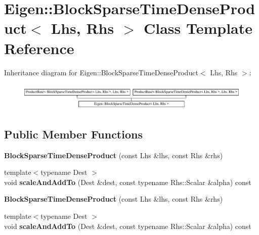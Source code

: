 \hypertarget{class_eigen_1_1_block_sparse_time_dense_product}{}\section{Eigen\+:\+:Block\+Sparse\+Time\+Dense\+Product$<$ Lhs, Rhs $>$ Class Template Reference}
\label{class_eigen_1_1_block_sparse_time_dense_product}
Inheritance diagram for Eigen\+:\+:Block\+Sparse\+Time\+Dense\+Product$<$ Lhs, Rhs $>$\+:\begin{figure}[H]
\begin{center}
\leavevmode
\includegraphics[height=1.314554cm]{class_eigen_1_1_block_sparse_time_dense_product}
\end{center}
\end{figure}
\subsection*{Public Member Functions}
\begin{DoxyCompactItemize}
\item 
\mbox{\label{class_eigen_1_1_block_sparse_time_dense_product_a0965e817adda116fafe1fc4421add58d}} 
{\bfseries Block\+Sparse\+Time\+Dense\+Product} (const Lhs \&lhs, const Rhs \&rhs)
\item 
\mbox{\label{class_eigen_1_1_block_sparse_time_dense_product_ac34093e669d35a5dad6c723158e752be}} 
{\footnotesize template$<$typename Dest $>$ }\\void {\bfseries scale\+And\+Add\+To} (Dest \&dest, const typename Rhs\+::\+Scalar \&alpha) const
\item 
\mbox{\label{class_eigen_1_1_block_sparse_time_dense_product_a0965e817adda116fafe1fc4421add58d}} 
{\bfseries Block\+Sparse\+Time\+Dense\+Product} (const Lhs \&lhs, const Rhs \&rhs)
\item 
\mbox{\label{class_eigen_1_1_block_sparse_time_dense_product_ac34093e669d35a5dad6c723158e752be}} 
{\footnotesize template$<$typename Dest $>$ }\\void {\bfseries scale\+And\+Add\+To} (Dest \&dest, const typename Rhs\+::\+Scalar \&alpha) const
\end{DoxyCompactItemize}


